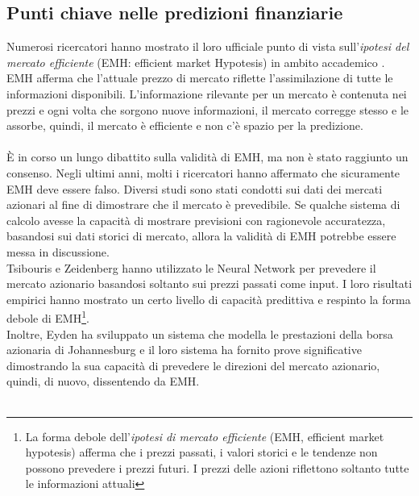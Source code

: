 \documentclass[a4paper,12pt]{report}
\begin{document}
\subsection{Punti chiave nelle predizioni finanziarie}
Numerosi ricercatori hanno mostrato il loro ufficiale punto di vista sull'\textit{ipotesi del mercato efficiente} (EMH: efficient market Hypotesis) in ambito accademico \cite{emh1}\cite{emh2}. EMH afferma che l'attuale prezzo di mercato riflette l'assimilazione di tutte le informazioni disponibili\cite{emh3}. L'informazione rilevante per un mercato è contenuta nei prezzi e ogni volta che sorgono nuove informazioni, il mercato corregge stesso e le assorbe, quindi, il mercato è efficiente e non c'è spazio per la predizione\cite{emh4}.\\~\\
È in corso un lungo dibattito sulla validità di EMH, ma non è stato raggiunto un consenso. Negli ultimi anni, molti i ricercatori hanno affermato che sicuramente EMH deve essere falso\cite{emh4}. Diversi studi sono stati condotti sui dati dei mercati azionari al fine di dimostrare che il mercato è prevedibile. Se qualche sistema di calcolo avesse la capacità di mostrare previsioni con ragionevole accuratezza, basandosi sui dati storici di mercato, allora la validità di EMH potrebbe essere messa in discussione.\\
Tsibouris e Zeidenberg\cite{emh0} hanno utilizzato le Neural Network per prevedere il mercato azionario basandosi soltanto sui prezzi passati come input. I loro risultati empirici hanno mostrato un certo livello di capacità predittiva e respinto la forma debole di EMH\footnote{La forma debole dell'\textit{ipotesi di mercato efficiente} (EMH, efficient market hypotesis) afferma che i prezzi passati, i valori storici e le tendenze non possono prevedere i prezzi futuri. I prezzi delle azioni riflettono soltanto tutte le informazioni attuali}.\\
Inoltre, Eyden \cite{nn-eyden} ha sviluppato un sistema che modella le prestazioni della borsa azionaria di Johannesburg e il loro sistema ha fornito prove significative dimostrando la sua capacità di prevedere le direzioni del mercato azionario, quindi, di nuovo, dissentendo da EMH.\\~\\
\end{document}
